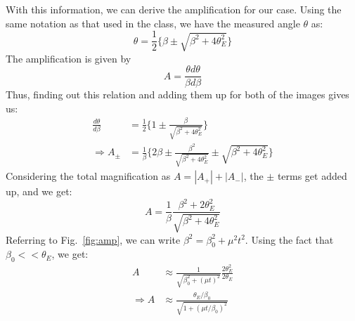 \documentclass{article}
\begin{document}
With this information, we can derive the amplification for  our case. Using the same notation as that used in the class, we have the measured angle $\theta$ as:
\begin{equation}
\theta = \frac{1}{2} \{\beta \pm \sqrt{\beta^2+4\theta_E^2}\}
\label{eqn12:1}
\end{equation}
The amplification is given by 
\begin{equation}
A = \frac{\theta d\theta }{\beta d\beta}
\label{eqn12:2}
\end{equation}
Thus, finding out this relation and adding them up for both of the images gives us:
\begin{equation}
\begin{split}
\frac{d\theta}{d\beta} &= \frac{1}{2} \{1\pm\frac{\beta}{\sqrt{\beta^2+4\theta_E^2}}\} \\
\Rightarrow A_{\pm} &= \frac{1}{\beta} \{2\beta \pm \frac{\beta^2}{\sqrt{\beta^2+4\theta_E^2}} \pm \sqrt{\beta^2+4\theta_E^2}\}
\end{split}
\end{equation}
Considering the total magnification as $A = |A_+|+|A_-|$, the $\pm$ terms get added up, and we get:
\begin{equation}
A = \frac{1}{\beta}\frac{\beta^2+2\theta_E^2}{\sqrt{\beta^2+4\theta_E^2}} 
\end{equation}
Referring to Fig.~\ref{fig:amp}, we can write $\beta^2 = \beta_0^2+ \mu^2 t^2$. Using the fact that $\beta_0<<\theta_E$, we get:
\begin{equation}
\begin{split}
A &\approx \frac{1}{\sqrt{\beta_0^2+(\mu t)^2}}\frac{2\theta_E^2}{2\theta_E} \\
\Rightarrow A &\approx \frac{\theta_E/\beta_0}{\sqrt{1+(\mu t/\beta_0)^2}}
\end{split}
\end{equation}
\end{document}
